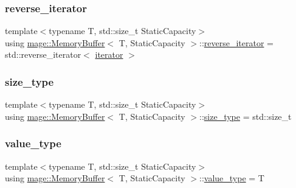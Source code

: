\mbox{\label{classmage_1_1_memory_buffer_a0ff72cf71e4955a859ed8afd70832c92}} 
\subsubsection{\texorpdfstring{reverse\+\_\+iterator}{reverse\_iterator}}
{\footnotesize\ttfamily template$<$typename T, std\+::size\+\_\+t Static\+Capacity$>$ \\
using \mbox{\hyperlink{classmage_1_1_memory_buffer}{mage\+::\+Memory\+Buffer}}$<$ T, Static\+Capacity $>$\+::\mbox{\hyperlink{classmage_1_1_memory_buffer_a0ff72cf71e4955a859ed8afd70832c92}{reverse\+\_\+iterator}} =  std\+::reverse\+\_\+iterator$<$ \mbox{\hyperlink{classmage_1_1_memory_buffer_af487a5f5f07f8ba65e3a5d3a26d32b6c}{iterator}} $>$}

\mbox{\label{classmage_1_1_memory_buffer_a77b459da2e6f1c57c21467a6eff8e9f9}} 
\subsubsection{\texorpdfstring{size\+\_\+type}{size\_type}}
{\footnotesize\ttfamily template$<$typename T, std\+::size\+\_\+t Static\+Capacity$>$ \\
using \mbox{\hyperlink{classmage_1_1_memory_buffer}{mage\+::\+Memory\+Buffer}}$<$ T, Static\+Capacity $>$\+::\mbox{\hyperlink{classmage_1_1_memory_buffer_a77b459da2e6f1c57c21467a6eff8e9f9}{size\+\_\+type}} =  std\+::size\+\_\+t}

\mbox{\label{classmage_1_1_memory_buffer_a3f8a036eaa59236b80342ba3a251c9e8}} 
\subsubsection{\texorpdfstring{value\+\_\+type}{value\_type}}
{\footnotesize\ttfamily template$<$typename T, std\+::size\+\_\+t Static\+Capacity$>$ \\
using \mbox{\hyperlink{classmage_1_1_memory_buffer}{mage\+::\+Memory\+Buffer}}$<$ T, Static\+Capacity $>$\+::\mbox{\hyperlink{classmage_1_1_memory_buffer_a3f8a036eaa59236b80342ba3a251c9e8}{value\+\_\+type}} =  T}




